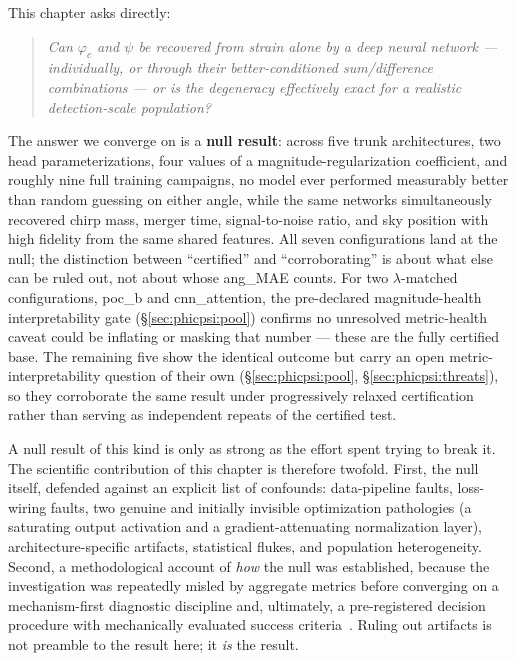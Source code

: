 This chapter asks directly:
\begin{quote}
\itshape Can $\varphi_c$ and $\psi$ be recovered from strain alone by a deep neural network --- individually, or through their better-conditioned sum/difference combinations --- or is the degeneracy effectively exact for a realistic detection-scale population?
\end{quote}

The answer we converge on is a \textbf{null result}: across five trunk architectures, two head parameterizations, four values of a magnitude-regularization coefficient, and roughly nine full training campaigns, no model ever performed measurably better than random guessing on either angle, while the same networks simultaneously recovered chirp mass, merger time, signal-to-noise ratio, and sky position with high fidelity from the same shared features.
All seven configurations land at the null; the distinction between ``certified'' and ``corroborating'' is about what else can be ruled out, not about whose ang\_MAE counts.
For two $\lambda$-matched configurations, poc\_b and cnn\_attention, the pre-declared magnitude-health interpretability gate (\S\ref{sec:phicpsi:pool}) confirms no unresolved metric-health caveat could be inflating or masking that number --- these are the fully certified base.
The remaining five show the identical outcome but carry an open metric-interpretability question of their own (\S\ref{sec:phicpsi:pool}, \S\ref{sec:phicpsi:threats}), so they corroborate the same result under progressively relaxed certification rather than serving as independent repeats of the certified test.

A null result of this kind is only as strong as the effort spent trying to break it.
The scientific contribution of this chapter is therefore twofold.
First, the null itself, defended against an explicit list of confounds: data-pipeline faults, loss-wiring faults, two genuine and initially invisible optimization pathologies (a saturating output activation and a gradient-attenuating normalization layer), architecture-specific artifacts, statistical flukes, and population heterogeneity.
Second, a methodological account of \emph{how} the null was established, because the investigation was repeatedly misled by aggregate metrics before converging on a mechanism-first diagnostic discipline and, ultimately, a pre-registered decision procedure with mechanically evaluated success criteria~\cite{nosek2018preregistration}.
Ruling out artifacts is not preamble to the result here; it \emph{is} the result.

